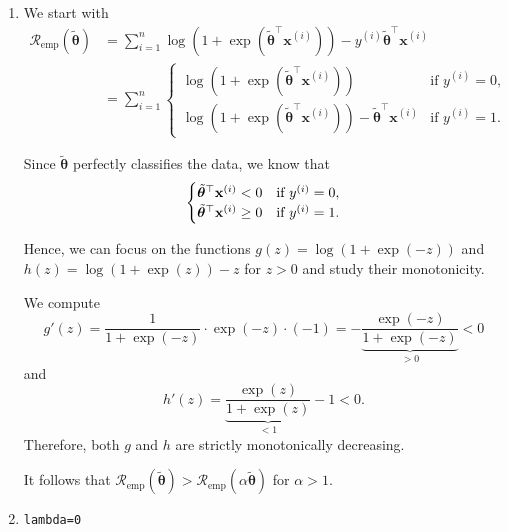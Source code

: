 \documentclass[a4paper]{article}
\makeatletter
\newcommand{\hlnum}[1]{\textcolor[rgb]{0.686,0.059,0.569}{#1}}%
\newcommand{\hlstd}[1]{\textcolor[rgb]{0.345,0.345,0.345}{#1}}%
\newcommand{\hlkwb}[1]{\textcolor[rgb]{0.69,0.353,0.396}{#1}}%
\newenvironment{kframe}{%
 \def\at@end@of@kframe{}%
 \ifinner\ifhmode%
  \def\at@end@of@kframe{\end{minipage}}%
  \begin{minipage}{\columnwidth}%
 \fi\fi%
 \def\FrameCommand##1{\hskip\@totalleftmargin \hskip-\fboxsep
 \colorbox{shadecolor}{##1}\hskip-\fboxsep
     \hskip-\linewidth \hskip-\@totalleftmargin \hskip\columnwidth}%
 \MakeFramed {\advance\hsize-\width
   \@totalleftmargin\z@ \linewidth\hsize
   \@setminipage}}%
 {\par\unskip\endMakeFramed%
 \at@end@of@kframe}
\newenvironment{knitrout}{}{} %
\makeatother
\begin{document}
{\begin{enumerate}
\item
We start with
\begin{align*}
  \mathcal{R}_\text{emp}(\tilde{\bm{\theta}}) &= \sum^n_{i=1} \log(1 + \exp(\tilde{\bm{\theta}}^\top \mathbf{x}^{(i)})) - y^{(i)}\tilde{\bm{\theta}}^\top \mathbf{x}^{(i)} \\
  &= \sum^n_{i=1} \begin{cases}
    \log(1 + \exp(\tilde{\bm{\theta}}^\top \mathbf{x}^{(i)})) & \text{if $y^{(i)} = 0$}, \\
    \log(1 + \exp(\tilde{\bm{\theta}}^\top \mathbf{x}^{(i)})) - \tilde{\bm{\theta}}^\top \mathbf{x}^{(i)} & \text{if $y^{(i)} = 1$}.
  \end{cases}
\end{align*}

Since $\tilde{\bm{\theta}}$ perfectly classifies the data, we know that
\begin{equation*}
  \begin{cases}
    \tilde{\bm{\theta}}^\top \mathbf{x}^{(i)} < 0 & \text{if $y^{(i)} = 0$}, \\
    \tilde{\bm{\theta}}^\top \mathbf{x}^{(i)} \geq 0 & \text{if $y^{(i)} = 1$}.
  \end{cases}
\end{equation*}

Hence, we can focus on the functions $g(z) = \log(1 + \exp(-z))$ and $h(z) = \log(1 + \exp(z)) - z$ for $z > 0$ and study their monotonicity.

We compute
\begin{equation*}
  g'(z) = \frac{1}{1 + \exp(-z)} \cdot \exp(-z) \cdot (-1) = - \underbrace{\frac{\exp(-z)}{1 + \exp(-z)}}_{> 0} < 0
\end{equation*}
and
\begin{equation*}
  h'(z) = \underbrace{\frac{\exp(z)}{1 + \exp(z)}}_{< 1} - 1 < 0.
\end{equation*}
Therefore, both $g$ and $h$ are strictly monotonically decreasing.

It follows that $\mathcal{R}_\text{emp}(\tilde{\bm{\theta}}) > \mathcal{R}_\text{emp}(\alpha \tilde{\bm{\theta}})$ for $\alpha > 1$.

\item
\begin{knitrout}
\color{fgcolor}\begin{kframe}
\begin{alltt}
\hlstd{lambda} \hlkwb{=} \hlnum{0}


\end{alltt}
\end{kframe}
\end{knitrout}
\end{enumerate}}
\end{document}

